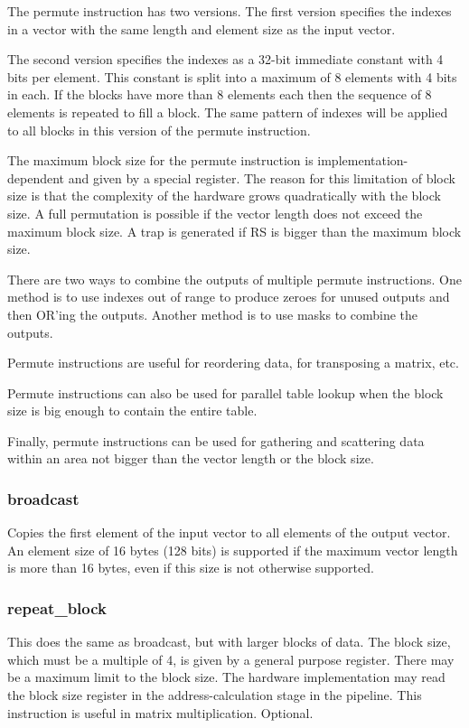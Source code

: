 \documentclass[forwardcom.tex]{subfiles}
\begin{document}
The permute instruction has two versions. The first version specifies the indexes in a vector with the same length and element size as the input vector.
\vspace{2mm}

The second version specifies the indexes as a 32-bit immediate constant with 4 bits per element. This constant is split into a maximum of 8 elements with 4 bits in each. If the blocks have more than 8 elements each then the sequence of 8 elements is repeated to fill a block. The same pattern of indexes will be applied to all blocks in this version of the permute instruction.
\vspace{2mm}

The maximum block size for the permute instruction is implementation-dependent and given by a special register. The reason for this limitation of block size is that the complexity of the hardware grows quadratically with the block size. A full permutation is possible if the vector length does not exceed the maximum block size. A trap is generated if RS is bigger than the maximum block size.
\vspace{2mm}

There are two ways to combine the outputs of multiple permute instructions. One method is to use indexes out of range to produce zeroes for unused outputs and then OR'ing the outputs. Another method is to use masks to combine the outputs.
\vspace{2mm}

Permute instructions are useful for reordering data, for transposing a matrix, etc. 
\vspace{2mm}

Permute instructions can also be used for parallel table lookup when the block size is big enough to contain the entire table.
\vspace{2mm}

Finally, permute instructions can be used for gathering and scattering data within an area not bigger than the vector length or the block size.

\subsubsection{broadcast}
Copies the first element of the input vector to all elements of the output vector. An element size of 16 bytes (128 bits) is supported if the maximum vector length is more than 16 bytes, even if this size is not otherwise supported.

\subsubsection{repeat\_block}
This does the same as broadcast, but with larger blocks of data. The block size, which must be a multiple of 4, is given by a general purpose register. There may be a maximum limit to the block size. The hardware implementation may read the block size register in the address-calculation stage in the pipeline. 
This instruction is useful in matrix multiplication. Optional.
\end{document}
